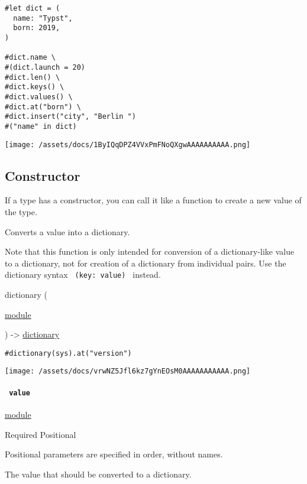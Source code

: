 \begin{verbatim}
#let dict = (
  name: "Typst",
  born: 2019,
)

#dict.name \
#(dict.launch = 20)
#dict.len() \
#dict.keys() \
#dict.values() \
#dict.at("born") \
#dict.insert("city", "Berlin ")
#("name" in dict)
\end{verbatim}

\texttt{[image: /assets/docs/1ByIQqDPZ4VVxPmFNoQXgwAAAAAAAAAA.png]}

\subsection{\texorpdfstring{Constructor
{}}{Constructor }}\label{constructor}

\phantomsection\label{constructor-constructor-tooltip}
If a type has a constructor, you can call it like a function to create a
new value of the type.

Converts a value into a dictionary.

Note that this function is only intended for conversion of a
dictionary-like value to a dictionary, not for creation of a dictionary
from individual pairs. Use the dictionary syntax
\texttt{\ (key:\ value)\ } instead.

{ dictionary } (

{ \href{/docs/reference/foundations/module/}{module} }

) -\textgreater{}
\href{/docs/reference/foundations/dictionary/}{dictionary}

\begin{verbatim}
#dictionary(sys).at("version")
\end{verbatim}

\texttt{[image: /assets/docs/vrwNZ5Jfl6kz7gYnEOsM0AAAAAAAAAAA.png]}

\paragraph{\texorpdfstring{\texttt{\ value\ }}{ value }}\label{constructor-value}

\href{/docs/reference/foundations/module/}{module}

{Required} {{ Positional }}

\label{constructor-value-positional-tooltip}
Positional parameters are specified in order, without names.

The value that should be converted to a dictionary.

